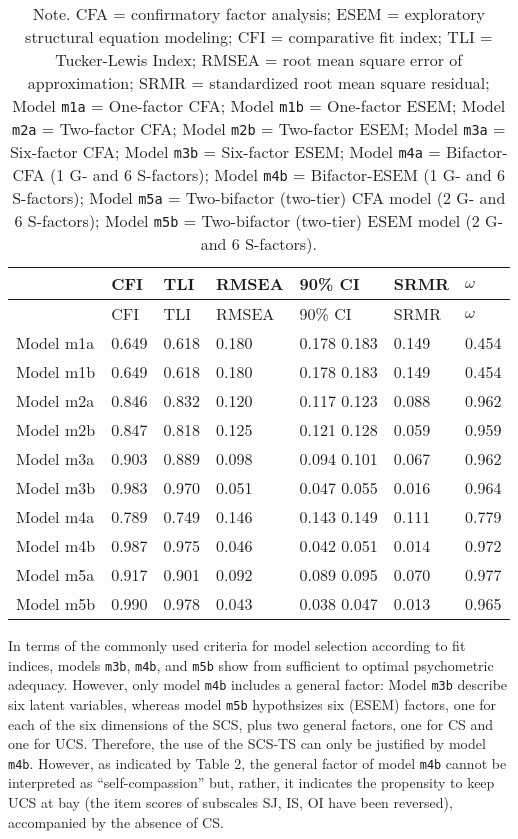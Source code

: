 \documentclass[
  man]{apa7}
\begin{document}
\begin{longtable}[]{@{}lllllll@{}}
\caption{Note. CFA = confirmatory factor analysis; ESEM = exploratory structural equation modeling; CFI = comparative fit index; TLI = Tucker-Lewis Index; RMSEA = root mean square error of approximation; SRMR = standardized root mean square residual; Model \texttt{m1a} = One-factor CFA; Model \texttt{m1b} = One-factor ESEM; Model \texttt{m2a} = Two-factor CFA; Model \texttt{m2b} = Two-factor ESEM; Model \texttt{m3a} = Six-factor CFA; Model \texttt{m3b} = Six-factor ESEM; Model \texttt{m4a} = Bifactor-CFA (1 G- and 6 S-factors); Model \texttt{m4b} = Bifactor-ESEM (1 G- and 6 S-factors); Model \texttt{m5a} = Two-bifactor (two-tier) CFA model (2 G- and 6 S-factors); Model \texttt{m5b} = Two-bifactor (two-tier) ESEM model (2 G- and 6 S-factors).}\tabularnewline
\toprule()
& CFI & TLI & RMSEA & 90\% CI & SRMR & \(\omega\) \\
\midrule()
\endfirsthead
\toprule()
& CFI & TLI & RMSEA & 90\% CI & SRMR & \(\omega\) \\
\midrule()
\endhead
Model m1a & 0.649 & 0.618 & 0.180 & 0.178 0.183 & 0.149 & 0.454 \\
Model m1b & 0.649 & 0.618 & 0.180 & 0.178 0.183 & 0.149 & 0.454 \\
Model m2a & 0.846 & 0.832 & 0.120 & 0.117 0.123 & 0.088 & 0.962 \\
Model m2b & 0.847 & 0.818 & 0.125 & 0.121 0.128 & 0.059 & 0.959 \\
Model m3a & 0.903 & 0.889 & 0.098 & 0.094 0.101 & 0.067 & 0.962 \\
Model m3b & 0.983 & 0.970 & 0.051 & 0.047 0.055 & 0.016 & 0.964 \\
Model m4a & 0.789 & 0.749 & 0.146 & 0.143 0.149 & 0.111 & 0.779 \\
Model m4b & 0.987 & 0.975 & 0.046 & 0.042 0.051 & 0.014 & 0.972 \\
Model m5a & 0.917 & 0.901 & 0.092 & 0.089 0.095 & 0.070 & 0.977 \\
Model m5b & 0.990 & 0.978 & 0.043 & 0.038 0.047 & 0.013 & 0.965 \\
\bottomrule()
\end{longtable}

In terms of the commonly used criteria for model selection according to fit indices, models \texttt{m3b}, \texttt{m4b}, and \texttt{m5b} show from sufficient to optimal psychometric adequacy. However, only model \texttt{m4b} includes a general factor: Model \texttt{m3b} describe six latent variables, whereas model \texttt{m5b} hypothsizes six (ESEM) factors, one for each of the six dimensions of the SCS, plus two general factors, one for CS and one for UCS. Therefore, the use of the SCS-TS can only be justified by model \texttt{m4b}. However, as indicated by Table 2, the general factor of model \texttt{m4b} cannot be interpreted as ``self-compassion'' but, rather, it indicates the propensity to keep UCS at bay (the item scores of subscales SJ, IS, OI have been reversed), accompanied by the absence of CS.
\end{document}
